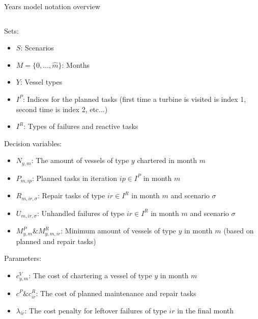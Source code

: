 \documentclass{beamer}
\newcommand{\smalld}{\tiny}
\begin{document}
\begin{frame}{Years model notation overview}
\smalld
\begin{columns}
\begin{column}{.48\textwidth}
Sets:
\begin{itemize}
\item $S$: Scenarios
\item $M = \{0 , \dots , \hat{m}\}$: Months
\item $Y$: Vessel types
\item $I^P$: Indices for the planned tasks (first time a turbine is visited is index 1, second time is index 2, etc...)
\item $I^R$: Types of failures and reactive tasks
\end{itemize}

Decision variables:
\begin{itemize}
\item $N_{y,m}$: The amount of vessels of type $y$ chartered in month $m$
\item $P_{m,ip}$: Planned tasks in iteration $ip \in I^P$ in month $m$
\item $R_{m,ir,\sigma}$: Repair tasks of type $ir \in I^R$ in month $m$ and scenario $\sigma$
\item $U_{m,ir,\sigma}$: Unhandled failures of type $ir \in I^R$ in month $m$ and scenario $\sigma$
\item $M^P_{y, m} \& M^R_{y, m, ir}$: Minimum amount of vessels of type $y$ in month $m$ (based on planned and repair tasks)
\end{itemize}

Parameters:
\begin{itemize}
\item $c^V_{y,m}$: The cost of chartering a vessel of type $y$ in month $m$
\item $c^P \& c^R_{ir}$: The cost of planned maintenance and repair tasks
\item $\lambda_{ir}$: The cost penalty for leftover failures of type $ir$ in the final month
\end{itemize}
\end{column}

\hfill


\end{columns}
\end{frame}
\end{document}
